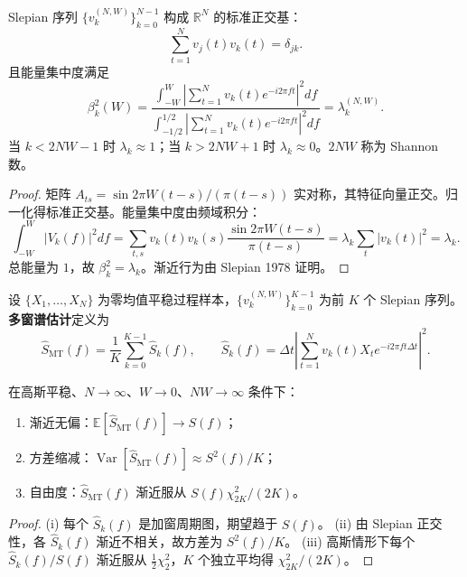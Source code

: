 \begin{theorem}\label{thm:slepian}
Slepian 序列 $\{v_k^{(N,W)}\}_{k=0}^{N-1}$ 构成 $\mathbb R^N$ 的标准正交基：
\[
\sum_{t=1}^{N}v_j(t)v_k(t)=\delta_{jk}.
\]
且能量集中度满足
\[
\beta_k^2(W)=\frac{\int_{-W}^{W}|\sum_{t=1}^{N}v_k(t)e^{-i2\pi ft}|^2df}{\int_{-1/2}^{1/2}|\sum_{t=1}^{N}v_k(t)e^{-i2\pi ft}|^2df}=\lambda_k^{(N,W)}.
\]
当 $k<2NW-1$ 时 $\lambda_k\approx1$；当 $k>2NW+1$ 时 $\lambda_k\approx0$。$2NW$ 称为 Shannon 数。
\end{theorem}

\begin{proof}
矩阵 $A_{ts}=\sin2\pi W(t-s)/(\pi(t-s))$ 实对称，其特征向量正交。归一化得标准正交基。能量集中度由频域积分：
\[
\int_{-W}^{W}|V_k(f)|^2df
=\sum_{t,s}v_k(t)v_k(s)\frac{\sin2\pi W(t-s)}{\pi(t-s)}
=\lambda_k\sum_t|v_k(t)|^2=\lambda_k.
\]
总能量为 $1$，故 $\beta_k^2=\lambda_k$。渐近行为由 Slepian 1978 证明。
\end{proof}

\begin{definition}[多窗谱估计]\label{def:multitaper}
设 $\{X_1,\dots,X_N\}$ 为零均值平稳过程样本，$\{v_k^{(N,W)}\}_{k=0}^{K-1}$ 为前 $K$ 个 Slepian 序列。\textbf{多窗谱估计}定义为
\[
\hat S_{\mathrm{MT}}(f)=\frac1K\sum_{k=0}^{K-1}\hat S_k(f),\qquad
\hat S_k(f)=\Delta t\left|\sum_{t=1}^{N}v_k(t)X_te^{-i2\pi ft\Delta t}\right|^2.
\]
\end{definition}

\begin{proposition}\label{prop:multitaper_consistency}
在高斯平稳、$N\to\infty$、$W\to0$、$NW\to\infty$ 条件下：
\begin{enumerate}[label=(\roman*)]
    \item 渐近无偏：$\mathbb E[\hat S_{\mathrm{MT}}(f)]\to S(f)$；
    \item 方差缩减：$\operatorname{Var}[\hat S_{\mathrm{MT}}(f)]\approx S^2(f)/K$；
    \item 自由度：$\hat S_{\mathrm{MT}}(f)$ 渐近服从 $S(f)\chi^2_{2K}/(2K)$。
\end{enumerate}
\end{proposition}

\begin{proof}
(i) 每个 $\hat S_k(f)$ 是加窗周期图，期望趋于 $S(f)$。
(ii) 由 Slepian 正交性，各 $\hat S_k(f)$ 渐近不相关，故方差为 $S^2(f)/K$。
(iii) 高斯情形下每个 $\hat S_k(f)/S(f)$ 渐近服从 $\frac12\chi^2_2$，$K$ 个独立平均得 $\chi^2_{2K}/(2K)$。
\end{proof}

